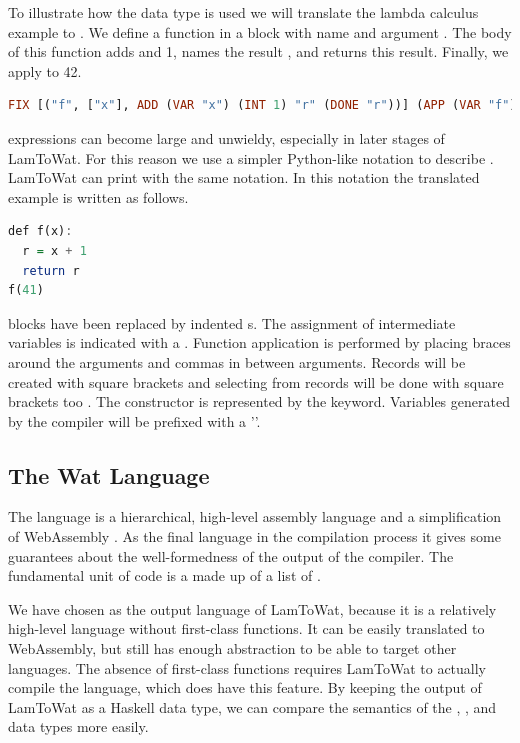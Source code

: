 {To illustrate how the  data type is used we will translate the lambda calculus example  to . We define a function in a  block with name  and argument . The body of this function adds  and 1, names the result , and returns this result. Finally, we apply  to 42.

\begin{lstlisting}[language=Haskell]
  FIX [("f", ["x"], ADD (VAR "x") (INT 1) "r" (DONE "r"))] (APP (VAR "f") [INT 41])
\end{lstlisting}

 expressions can become large and unwieldy, especially in later stages of LamToWat. For this reason we use a simpler Python-like notation to describe . LamToWat can print  with the same notation. In this notation the translated example is written as follows.

\begin{lstlisting}[language=Haskell]
def f(x):
  r = x + 1
  return r
f(41)
\end{lstlisting}

 blocks have been replaced by indented s. The assignment of intermediate variables is indicated with a \icode{=}. Function application is performed by placing braces around the arguments and commas in between arguments. Records will be created with square brackets \icode{[1,2,3]} and selecting from records will be done with square brackets too . The  constructor is represented by the  keyword. Variables generated by the compiler will be prefixed with a '\icode{_}'.

\subsection{\label{subsection:webdata}The Wat Language}
The  language is a hierarchical, high-level assembly language and a simplification of WebAssembly \autocite{webassemblyhomepage}. As the final language in the compilation process it gives some guarantees about the well-formedness of the output of the compiler. The fundamental unit of code is a  made up of a list of . 

We have chosen  as the output language of LamToWat, because it is a relatively high-level language without first-class functions. It can be easily translated to WebAssembly, but still has enough abstraction to be able to target other languages. The absence of first-class functions requires LamToWat to actually compile the  language, which does have this feature. By keeping the output of LamToWat as a Haskell data type, we can compare the semantics of the , , and  data types more easily.

}
